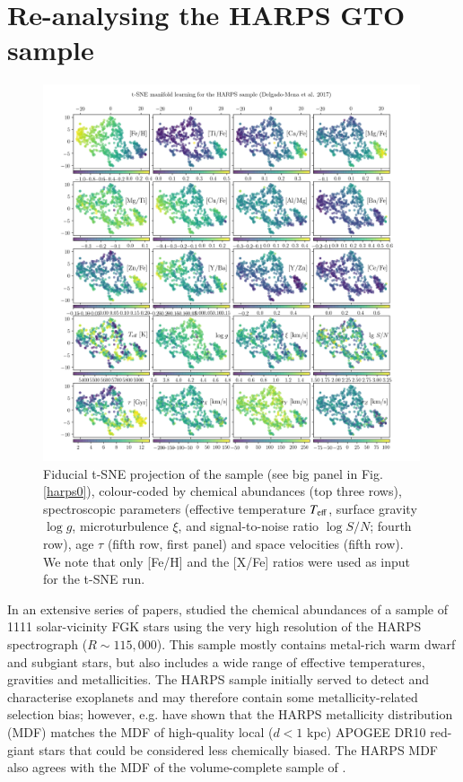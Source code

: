 \documentclass{aa}  %
\begin{document}
\section{Re-analysing the HARPS GTO sample}\label{harps}

\begin{figure}\centering
 \includegraphics[width=0.99\textwidth]{im/HARPS_tsne_plots_40_nice.png}
\caption{Fiducial t-SNE projection of the \citet{DelgadoMena2017} sample (see big panel in Fig. \ref{harps0}), colour-coded by chemical abundances (top three rows), spectroscopic parameters (effective temperature $T_{\rm eff}$, surface gravity $\log g$, microturbulence $\xi$, and signal-to-noise ratio $\log S/N$; fourth row), age $\tau$ (fifth row, first panel) and space velocities (fifth row). We note that only [Fe/H] and the [X/Fe] ratios were used as input for the t-SNE run.}
\label{harps1}
\end{figure}

In an extensive series of papers, \citet{Adibekyan2011, Adibekyan2012, DelgadoMena2014, DelgadoMena2015, BertrandeLis2015, Suarez-Andres2017, DelgadoMena2017, DelgadoMena2018} studied the chemical abundances of a sample of 1111 solar-vicinity FGK stars using the very high resolution of the HARPS spectrograph ($R\sim 115,000$). This sample mostly contains metal-rich warm dwarf and subgiant stars, but also includes a wide range of effective temperatures, gravities and metallicities. The HARPS sample initially served to detect and characterise exoplanets and may therefore contain some metallicity-related selection bias; however, e.g. \citet{Anders2014} have shown that the HARPS metallicity distribution (MDF) matches the MDF of high-quality local ($d<1$ kpc) APOGEE DR10 red-giant stars that could be considered less chemically biased. The HARPS MDF also agrees with the MDF of the volume-complete sample of \citet{Fuhrmann2011}.
\end{document}

